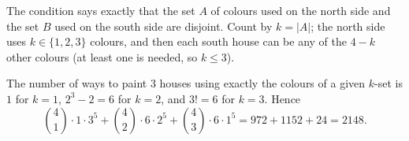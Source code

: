 The condition says exactly that the set $A$ of colours used on the north side and the set $B$ used on the south side are disjoint. Count by $k=|A|$; the north side uses $k\in\{1,2,3\}$ colours, and then each south house can be any of the $4-k$ other colours (at least one is needed, so $k\le3$).

The number of ways to paint $3$ houses using exactly the colours of a given $k$-set is $1$ for $k=1$, $2^3-2=6$ for $k=2$, and $3!=6$ for $k=3$. Hence
\[
\binom41\cdot1\cdot3^5+\binom42\cdot6\cdot2^5+\binom43\cdot6\cdot1^5=972+1152+24=\boxed{2148}.
\]
